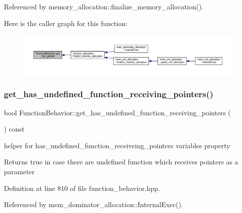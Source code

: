 Referenced by memory\+\_\+allocation\+::finalize\+\_\+memory\+\_\+allocation().

Here is the caller graph for this function\+:
\nopagebreak
\begin{figure}[H]
\begin{center}
\leavevmode
\includegraphics[width=350pt]{d9/d45/classFunctionBehavior_a76ce9c2966c256c2a0fb4930a7dd2f4a_icgraph}
\end{center}
\end{figure}
\mbox{\label{classFunctionBehavior_af51fe56b7c40304ec996f46833c92832}} 
\subsubsection{\texorpdfstring{get\+\_\+has\+\_\+undefined\+\_\+function\+\_\+receiving\+\_\+pointers()}{get\_has\_undefined\_function\_receiving\_pointers()}}
{\footnotesize\ttfamily bool Function\+Behavior\+::get\+\_\+has\+\_\+undefined\+\_\+function\+\_\+receiving\+\_\+pointers (\begin{DoxyParamCaption}{ }\end{DoxyParamCaption}) const\hspace{0.3cm}{\ttfamily [inline]}}



helper for has\+\_\+undefined\+\_\+function\+\_\+receiveing\+\_\+pointers variables property 

\begin{DoxyReturn}{Returns}
true in case there are undefined function which receives pointers as a parameter 
\end{DoxyReturn}


Definition at line 810 of file function\+\_\+behavior.\+hpp.



Referenced by mem\+\_\+dominator\+\_\+allocation\+::\+Internal\+Exec().

